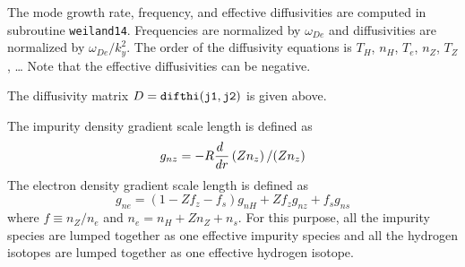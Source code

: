 The mode growth rate, frequency, and effective diffusivities are
computed in subroutine {\tt weiland14}.
Frequencies are normalized by $\omega_{De}$ and diffusivities are
normalized by $ \omega_{De} / k_y^2 $.
The order of the diffusivity equations is 
$ T_H $, $ n_H $, $ T_e $, $ n_Z $, $ T_Z $, \ldots
Note that the effective diffusivities can be negative.

The diffusivity matrix $ D = {\tt difthi(j1,j2)}$ 
is given above.


The impurity density gradient scale length is defined as 
$$g_{nz}=-R{{d\ }\over {dr}}\left(Zn_z\right)/(Zn_z)$$
The electron density gradient scale length is defined as
$$g_{ne}=(1-Zf_z-f_s)g_{nH}+Zf_zg_{nz}+f_sg_{ns}$$
where $ f \equiv n_Z / n_e $ and $ n_e = n_H + Z n_Z +n_s$.
For this purpose, all the impurity species are lumped together as 
one effective impurity species and all the hydrogen isotopes are lumped 
together as one effective hydrogen isotope.


